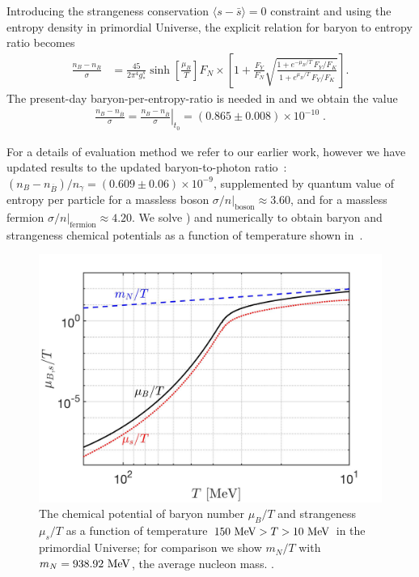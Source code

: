 Introducing the strangeness conservation $\langle s-\bar s\rangle=0$ constraint and using the entropy density in primordial Universe, the explicit relation for baryon to entropy ratio becomes
\begin{align}\label{muBeq}
\frac{n_B-n_{\overline{B}}}{\sigma}&=\frac{45}{2\pi^4g^s_\ast}\sinh\left[\frac{\mu_B}{T}\right]F_N\times\left[1+\frac{F_Y}{F_N}\sqrt{\frac{1+e^{-\mu_B/T}\,F_Y/F_K}{1+e^{\mu_B/T}\,F_Y/F_K}}\right].
\end{align}
The present-day baryon-per-entropy-ratio is needed  in   and we obtain the value 
\begin{align}\label{BdS}
\frac{n_B-n_{\overline{B}}}{\sigma}= \left.\frac{n_B-n_{\overline{B}}}{ \sigma}\right|_{t_0}=(0.865\pm0.008)\times10^{-10} \;.
\end{align}

For a details of evaluation method we refer to our earlier work, however we have updated results to the updated baryon-to-photon ratio~\cite{ParticleDataGroup:2018ovx}: $\left(n_B-n_{\overline{B}}\right)/n_\gamma= (0.609\pm0.06)\times10^{-9}$, supplemented by quantum value of entropy per particle for a massless boson $\sigma/n|_\mathrm{boson}\approx 3.60$, and for a massless fermion $\sigma/n|_\mathrm{fermion}\approx 4.20$. We solve ) and  numerically to obtain baryon and strangeness chemical potentials as a function of temperature shown in~.

\begin{figure} 
\centerline{\includegraphics[width=0.9\linewidth]{./plots/New_Chemical_Potential_C.jpg}}
\caption{The chemical potential of baryon number $\mu_B/T$ and strangeness $\mu_s/T$ as a function of temperature $150\text{ MeV}> T>10\text{ MeV}$ in the primordial Universe; for comparison we show $m_N/T $ with $m_N=938.92\text{ MeV}$, the average nucleon mass. . }
\label{ChemPotFig} 
\end{figure}

